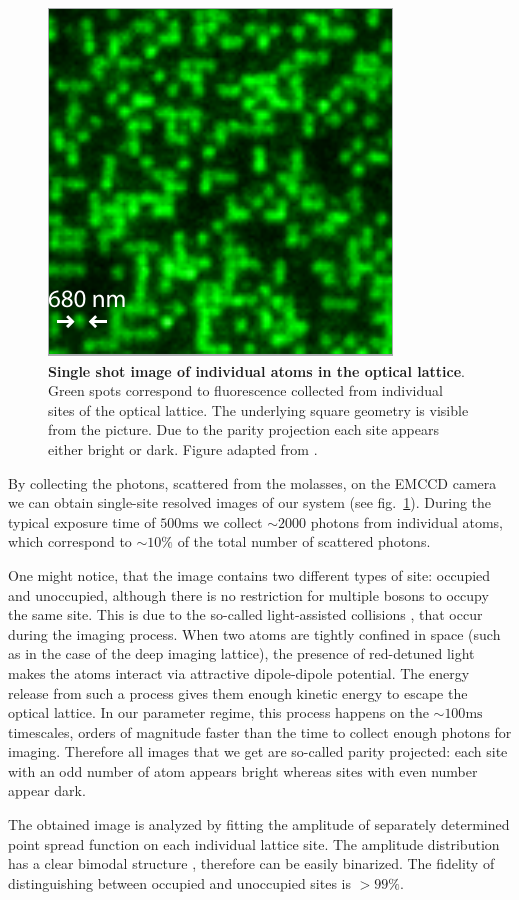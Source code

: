 \begin{figure}[t]
	\centering
	\includegraphics[scale=1]{figures/QGM_atoms.pdf}
	\caption{{\bf Single shot image of individual atoms in the optical lattice}. Green spots correspond to fluorescence collected from individual sites of the optical lattice. The underlying square geometry is visible from the picture. Due to the parity projection each site appears either bright or dark. Figure adapted from \cite{Bakr2009}.}
	\label{fig:QGM_atoms}
\end{figure}

By collecting the photons, scattered from the molasses, on the EMCCD camera we can obtain single-site resolved images of our system (see fig.~\ref{fig:QGM_atoms}). During the typical exposure time of $500 \mathrm{ms}$ we collect $\sim 2000$ photons from individual atoms, which correspond to $\sim 10\%$ of the total number of scattered photons. 

One might notice, that the image contains two different types of site: occupied and unoccupied, although there is no restriction for multiple bosons to occupy the same site. This is due to the so-called light-assisted collisions \cite{Adv. At., Mol., Opt. Phys. 34, 125 (1994), Nature Phys. 6, 951 (2010)}, that occur during the imaging process. When two atoms are tightly confined in space (such as in the case of the deep imaging lattice), the presence of red-detuned light makes the atoms interact via attractive dipole-dipole potential. The energy release from such a process gives them enough kinetic energy to escape the optical lattice. In our parameter regime, this process happens on the $\sim100 \mathrm{ms}$ timescales, orders of magnitude faster than the time to collect enough photons for imaging. Therefore all images that we get are so-called parity projected: each site with an odd number of atom appears bright whereas sites with even number appear dark. 

The obtained image is analyzed by fitting the amplitude of separately determined point spread function on each individual lattice site. The amplitude distribution has a clear bimodal structure \cite{Bakr2009}, therefore can be easily binarized. The fidelity of distinguishing between occupied and unoccupied sites is $>99\%$.